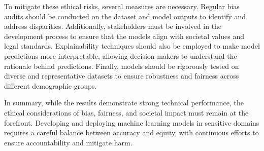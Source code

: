 	To mitigate these ethical risks, several measures are necessary. Regular bias audits should be conducted on the dataset and model outputs to identify and address disparities. Additionally, stakeholders must be involved in the development process to ensure that the models align with societal values and legal standards. Explainability techniques should also be employed to make model predictions more interpretable, allowing decision-makers to understand the rationale behind predictions. Finally, models should be rigorously tested on diverse and representative datasets to ensure robustness and fairness across different demographic groups.
	
	In summary, while the results demonstrate strong technical performance, the ethical considerations of bias, fairness, and societal impact must remain at the forefront. Developing and deploying machine learning models in sensitive domains requires a careful balance between accuracy and equity, with continuous efforts to ensure accountability and mitigate harm.
	
	
	
	


	


	
	
	
	
	
	
	
	

	
	



